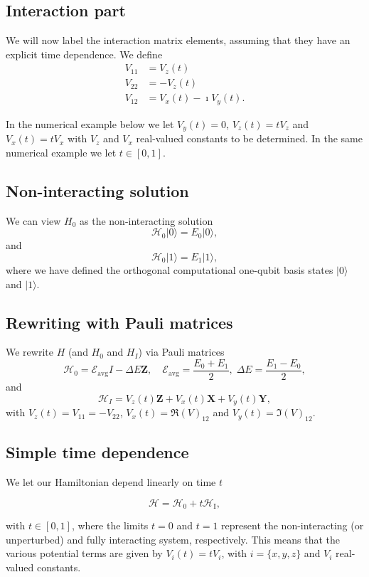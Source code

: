 \documentclass[%
oneside,                 %
final,                   %
10pt]{article}
\begin{document}
\subsection{Interaction part}

We will now label  the interaction matrix elements, assuming that they have an explicit time dependence.
We define
\begin{align*}
V_{11} & = V_z(t)\\
V_{22} & = -V_z(t)\\
V_{12} & = V_x(t)-\imath V_y(t).
\end{align*}

In the numerical example below we let $V_y(t)=0$, $V_z(t) = tV_z$
and $V_x(t) = tV_x$ with $V_z$ and $V_x$ real-valued constants to
be determined. In the same numerical example we let $t\in [0,1]$.

\subsection{Non-interacting solution}

We can view $H_0$ as the non-interacting solution
\[
       \mathcal{H}_0\vert 0 \rangle =E_0\vert 0 \rangle,
\]
and
\[
       \mathcal{H}_0\vert 1\rangle =E_1\vert 1\rangle,
\]
where we have defined the orthogonal computational one-qubit basis states $\vert 0\rangle$ and $\vert 1\rangle$.

\subsection{Rewriting with Pauli matrices}

We rewrite $H$ (and $H_0$ and $H_I$)  via Pauli matrices
\[
\mathcal{H}_0 = \mathcal{E}_{\mathrm{avg}} I -\Delta E \bm{Z}, \quad \mathcal{E}_{\mathrm{avg}} = \frac{E_0
  + E_1}{2}, \; \Delta E = \frac{E_1-E_0}{2},
\]
and
\[
\mathcal{H}_I = V_z(t)\bm{Z} + V_x(t)\bm{X}+V_y(t)\bm{Y},
\]
with $V_z(t) = V_{11}=-V_{22}$, $V_x(t) = \Re (V)_{12}$ and $V_y(t) = \Im (V)_{12}$.

\subsection{Simple time dependence}
We let our Hamiltonian depend linearly on time  $t$

\[
\mathcal{H}=\mathcal{H}_0+t \mathcal{H}_\mathrm{I},
\]

with $t \in [0,1]$, where the limits $t=0$ and $t=1$
represent the non-interacting (or unperturbed) and fully interacting
system, respectively. This means that the various potential terms are given by $V_i(t)=tV_i$, with $i=\{x,y,z\}$ and $V_i$ real-valued constants.
\end{document}
